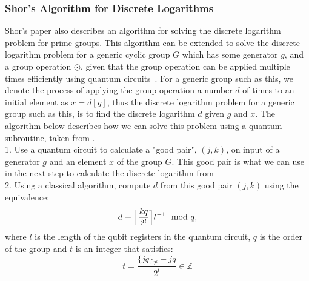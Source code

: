 \subsubsection{Shor's Algorithm for Discrete Logarithms}
Shor's paper also describes an algorithm for solving the discrete logarithm problem for prime groups. This algorithm can be extended to solve the discrete logarithm problem for a generic cyclic group $G$ which has some generator $g$, and a group operation $\odot$, given that the group operation can be applied multiple times efficiently using quantum circuits~\cite{ekeraa2016modifying}. For a generic group such as this, we denote the process of applying the group operation a number $d$ of times to an initial element as $x = d[g]$, thus the discrete logarithm problem for a generic group such as this, is to find the discrete logarithm $d$ given $g$ and $x$. The algorithm below describes how we can solve this problem using a quantum subroutine, taken from \cite{ekeraa2016modifying}.\\
1. Use a quantum circuit to calculate a "good pair", $(j,k)$, on input of a generator $g$ and an element $x$ of the group $G$. This good pair is what we can use in the next step to calculate the discrete logarithm from\\
2. Using a classical algorithm, compute $d$ from this good pair $(j,k)$ using the equivalence:
$$d \equiv \Bigl\lfloor\frac{kq}{2^l}\Bigr\rceil t^{-1}\mod q,$$ where $l$ is the length of the qubit registers in the quantum circuit, $q$ is the order of the group and $t$ is an integer that satisfies:
$$t = \frac{\{jq\}_{2^l}-jq}{2^l}\in \mathbb{Z}$$
